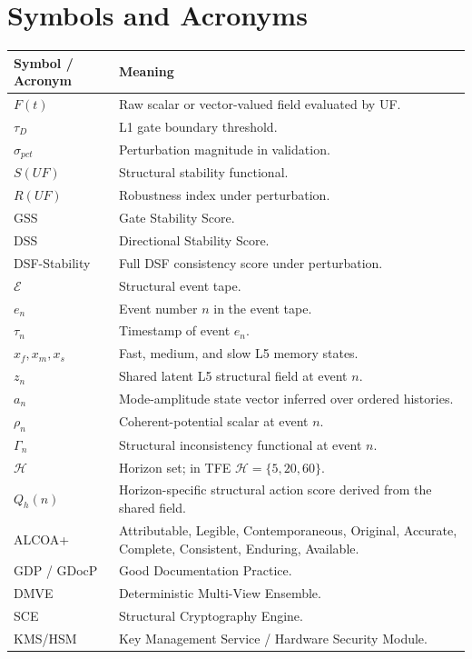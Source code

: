 \documentclass[11pt]{report}
\begin{document}
\section{Symbols and Acronyms}
\begin{longtable}{p{}p{}}
\toprule
Symbol / Acronym & Meaning \\
\midrule
$F(t)$ & Raw scalar or vector-valued field evaluated by UF. \\
$\tau_D$ & L1 gate boundary threshold. \\
$\sigma_{pct}$ & Perturbation magnitude in validation. \\
$S(UF)$ & Structural stability functional. \\
$R(UF)$ & Robustness index under perturbation. \\
GSS & Gate Stability Score. \\
DSS & Directional Stability Score. \\
DSF-Stability & Full DSF consistency score under perturbation. \\
$\mathcal{E}$ & Structural event tape. \\
$e_n$ & Event number $n$ in the event tape. \\
$\tau_n$ & Timestamp of event $e_n$. \\
$x_f,x_m,x_s$ & Fast, medium, and slow L5 memory states. \\
$z_n$ & Shared latent L5 structural field at event $n$. \\
$a_n$ & Mode-amplitude state vector inferred over ordered histories. \\
$\rho_n$ & Coherent-potential scalar at event $n$. \\
$\Gamma_n$ & Structural inconsistency functional at event $n$. \\
$\mathcal{H}$ & Horizon set; in TFE $\mathcal{H}=\{5,20,60\}$. \\
$Q_h(n)$ & Horizon-specific structural action score derived from the shared field. \\
ALCOA+ & Attributable, Legible, Contemporaneous, Original, Accurate, Complete, Consistent, Enduring, Available. \\
GDP / GDocP & Good Documentation Practice. \\
DMVE & Deterministic Multi-View Ensemble. \\
SCE & Structural Cryptography Engine. \\
KMS/HSM & Key Management Service / Hardware Security Module. \\
\bottomrule
\end{longtable}
\end{document}
